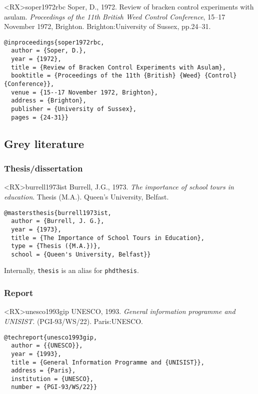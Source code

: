 \documentclass[10pt,a4paper]{article}
\newenvironment{info}{%
  \begin{list}{\makebox[2em][c]{\faInfoCircle}}{%
    \setlength{\leftmargin}{2em}
    \setlength{\labelwidth}{2em}
    \setlength{\labelsep}{0pt}}
}{\end{list}}
\begin{document}
\begin{bibexbox}<RX>{soper1972rbc}
  Soper, D., 1972. Review of bracken control experiments with asulam. \emph{Proceedings of the 11th British Weed Control Conference}, 15--17 November 1972, Brighton. Brighton:\@ University of Sussex, pp.24--31.
  \tcblower
\begin{Verbatim}
@inproceedings{soper1972rbc,
  author = {Soper, D.},
  year = {1972},
  title = {Review of Bracken Control Experiments with Asulam},
  booktitle = {Proceedings of the 11th {British} {Weed} {Control} {Conference}},
  venue = {15--17 November 1972, Brighton},
  address = {Brighton},
  publisher = {University of Sussex},
  pages = {24-31}}
\end{Verbatim}
\end{bibexbox}

\subsection{Grey literature}

\subsubsection*{Thesis/dissertation}

\begin{bibexbox}<RX>{burrell1973ist}
  Burrell, J.G., 1973. \emph{The importance of school tours in education}. Thesis (M.A.). Queen's University, Belfast.
  \tcblower
\begin{Verbatim}
@mastersthesis{burrell1973ist,
  author = {Burrell, J. G.},
  year = {1973},
  title = {The Importance of School Tours in Education},
  type = {Thesis ({M.A.})},
  school = {Queen's University, Belfast}}
\end{Verbatim}
\end{bibexbox}

\begin{info}\item Internally, \texttt{thesis} is an alias for \texttt{phdthesis}.\end{info}

\subsubsection*{Report}

\begin{bibexbox}<RX>{unesco1993gip}
  UNESCO, 1993. \emph{General information programme and UNISIST}\@. (PGI-93/WS/22). Paris:\@ UNESCO.
  \tcblower
\begin{Verbatim}
@techreport{unesco1993gip,
  author = {{UNESCO}},
  year = {1993},
  title = {General Information Programme and {UNISIST}},
  address = {Paris},
  institution = {UNESCO},
  number = {PGI-93/WS/22}}
\end{Verbatim}
\end{bibexbox}
\end{document}
